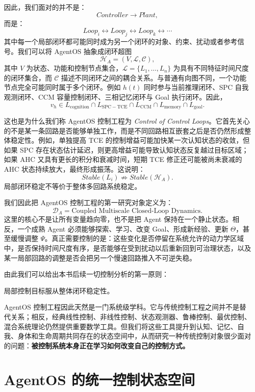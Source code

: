 因此，我们面对的并不是：
\[
Controller\rightarrow Plant,
\]
而是：
\[
\boxed{
Loop_i
\longleftrightarrow
Loop_j
\longleftrightarrow
Loop_k
\longleftrightarrow\cdots
}
\]
其中每一个局部闭环都可能同时成为另一个闭环的对象、约束、扰动或者参考信号。我们可以将 AgentOS 抽象成闭环超图
\[
\mathcal H_A=(V,\mathcal L,\mathcal C),
\]
其中 $V$ 为状态、功能和控制节点集合，$\mathcal L=\{L_1,\ldots,L_n\}$ 为具有不同特征时间尺度的闭环集合，而 $\mathcal C$ 描述不同闭环之间的耦合关系。与普通有向图不同，一个功能节点完全可能同时属于多个闭环。例如 $h(t)$ 同时参与当前推理闭环、SPC 自我观测闭环、CCM 容量控制闭环、三相记忆闭环与 Goal 执行闭环。因此，
\[
v_h\in L_{\mathrm{cognition}}
\cap
L_{\mathrm{SPC-TCE}}
\cap
L_{\mathrm{CCM}}
\cap
L_{\mathrm{memory}}
\cap
L_{\mathrm{goal}}.
\]

这也是为什么我们称 AgentOS 控制工程为 \emph{Control of Control Loops}。它首先关心的不是某一条回路是否能够单独工作，而是不同回路相互嵌套之后是否仍然形成整体稳定性。例如，单独提高 TCE 的控制增益可能加快某一次认知状态的收敛，但如果 SPC 存在状态估计延迟，则更高增益可能导致认知状态反复越过目标区域；如果 AHC 又具有更长的积分和衰减时间，短期 TCE 修正还可能被尚未衰减的 AHC 状态持续放大，最终形成振荡。这说明：
\[
Stable(L_i)
\not\Rightarrow
Stable(\mathcal H_A).
\]
局部闭环稳定不等价于整体多回路系统稳定。

我们因此把 AgentOS 控制工程的第一研究对象定义为：
\[
\boxed{
\mathcal D_A
=
\text{Coupled Multiscale Closed-Loop Dynamics}.
}
\]
这里的核心不是让所有变量趋向零，也不是把 Agent 保持在一个静止状态。相反，一个成熟 Agent 必须能够探索、学习、改变 Goal、形成新经验、更新 $\Theta$，甚至缓慢调整 $\Psi$。真正需要控制的是：这些变化是否停留在系统允许的动力学区域中，是否保持时间尺度有序，是否能够在受到扰动以后重新回到可治理状态，以及某一局部回路的调整是否会把另一个慢速回路推入不可逆失稳。

由此我们可以给出本书后续一切控制分析的第一原则：
\begin{proposition*}
局部控制目标服从整体闭环稳定性。
\end{proposition*}
AgentOS 控制工程因此天然是一门系统级学科。它与传统控制工程之间并不是替代关系；相反，经典线性控制、非线性控制、状态观测器、鲁棒控制、最优控制、混合系统理论仍然提供重要数学工具。但我们将这些工具提升到认知、记忆、自我、身体和生命周期共同存在的状态空间中，从而研究一种传统控制对象很少面对的问题：\textbf{被控制系统本身正在学习如何改变自己的控制方式。}

\section{AgentOS 的统一控制状态空间}

